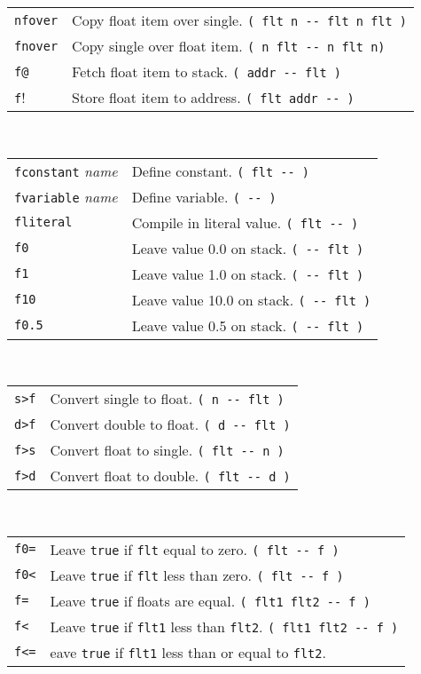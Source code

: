 \documentclass[10pt,landscape,a4paper]{article}
\begin{document}
\begin{multicols}{3}
\begin{tabular}{@{}ll@{}}
\verb!nfover! & Copy float item over single. \verb!( flt n -- flt n flt )! \\
\verb!fnover! & Copy single over float item. \verb!( n flt -- n flt n)! \\
\verb!f@! & Fetch float item to stack. \verb!( addr -- flt )! \\
\verb!f!! & Store float item to address. \verb!( flt addr -- )! \\
\end{tabular}\\
\begin{tabular}{@{}ll@{}}
\verb!fconstant! \textit{name} & Define constant. \verb!( flt -- )! \\
\verb!fvariable! \textit{name} & Define variable. \verb!( -- )! \\
\verb!fliteral! & Compile in literal value. \verb!( flt -- )! \\
\verb!f0! & Leave value 0.0 on stack. \verb!( -- flt )! \\
\verb!f1! & Leave value 1.0 on stack. \verb!( -- flt )! \\
\verb!f10! & Leave value 10.0 on stack. \verb!( -- flt )! \\
\verb!f0.5! & Leave value 0.5 on stack. \verb!( -- flt )! \\
\end{tabular}\\
\begin{tabular}{@{}ll@{}}
\verb!s>f! & Convert single to float. \verb!( n -- flt )! \\
\verb!d>f! & Convert double to float. \verb!( d -- flt )! \\
\verb!f>s! & Convert float to single. \verb!( flt -- n )! \\
\verb!f>d! & Convert float to double. \verb!( flt -- d )! \\
\end{tabular}\\
\begin{tabular}{@{}ll@{}}
\verb!f0=! & Leave \verb!true! if \verb!flt! equal to zero. \verb!( flt -- f )! \\
\verb!f0<! & Leave \verb!true! if \verb!flt! less than zero. \verb!( flt -- f )! \\
\verb!f=! & Leave \verb!true! if floats are equal. \verb!( flt1 flt2 -- f )! \\
\verb!f<! & Leave \verb!true! if \verb!flt1! less than \verb!flt2!. \verb!( flt1 flt2 -- f )! \\
\verb!f<=! & eave \verb!true! if \verb!flt1! less than or equal to \verb!flt2!. \\

\end{tabular}
\end{multicols}
\end{document}
